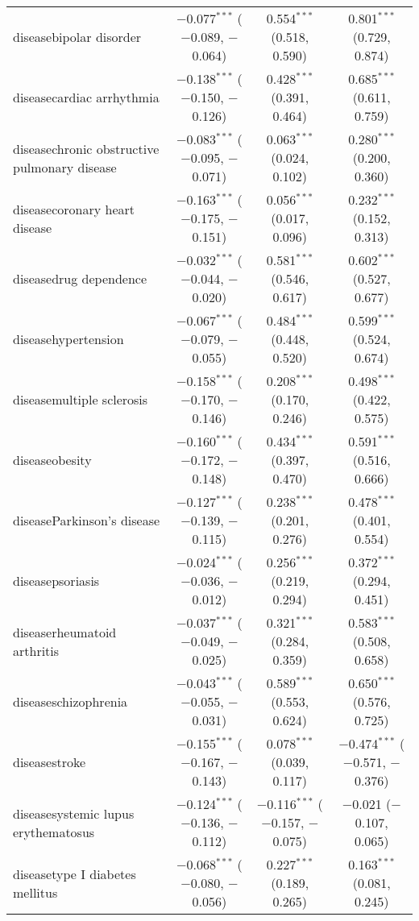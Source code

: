 \begin{table}[!htbp]
\begin{tabular}{@{\extracolsep{5pt}}lccc}
  diseasebipolar disorder & $-$0.077$^{***}$ ($-$0.089, $-$0.064) & 0.554$^{***}$ (0.518, 0.590) & 0.801$^{***}$ (0.729, 0.874) \\ 
  diseasecardiac arrhythmia & $-$0.138$^{***}$ ($-$0.150, $-$0.126) & 0.428$^{***}$ (0.391, 0.464) & 0.685$^{***}$ (0.611, 0.759) \\ 
  diseasechronic obstructive pulmonary disease & $-$0.083$^{***}$ ($-$0.095, $-$0.071) & 0.063$^{***}$ (0.024, 0.102) & 0.280$^{***}$ (0.200, 0.360) \\ 
  diseasecoronary heart disease & $-$0.163$^{***}$ ($-$0.175, $-$0.151) & 0.056$^{***}$ (0.017, 0.096) & 0.232$^{***}$ (0.152, 0.313) \\ 
  diseasedrug dependence & $-$0.032$^{***}$ ($-$0.044, $-$0.020) & 0.581$^{***}$ (0.546, 0.617) & 0.602$^{***}$ (0.527, 0.677) \\ 
  diseasehypertension & $-$0.067$^{***}$ ($-$0.079, $-$0.055) & 0.484$^{***}$ (0.448, 0.520) & 0.599$^{***}$ (0.524, 0.674) \\ 
  diseasemultiple sclerosis & $-$0.158$^{***}$ ($-$0.170, $-$0.146) & 0.208$^{***}$ (0.170, 0.246) & 0.498$^{***}$ (0.422, 0.575) \\ 
  diseaseobesity & $-$0.160$^{***}$ ($-$0.172, $-$0.148) & 0.434$^{***}$ (0.397, 0.470) & 0.591$^{***}$ (0.516, 0.666) \\ 
  diseaseParkinson's disease & $-$0.127$^{***}$ ($-$0.139, $-$0.115) & 0.238$^{***}$ (0.201, 0.276) & 0.478$^{***}$ (0.401, 0.554) \\ 
  diseasepsoriasis & $-$0.024$^{***}$ ($-$0.036, $-$0.012) & 0.256$^{***}$ (0.219, 0.294) & 0.372$^{***}$ (0.294, 0.451) \\ 
  diseaserheumatoid arthritis & $-$0.037$^{***}$ ($-$0.049, $-$0.025) & 0.321$^{***}$ (0.284, 0.359) & 0.583$^{***}$ (0.508, 0.658) \\ 
  diseaseschizophrenia & $-$0.043$^{***}$ ($-$0.055, $-$0.031) & 0.589$^{***}$ (0.553, 0.624) & 0.650$^{***}$ (0.576, 0.725) \\ 
  diseasestroke & $-$0.155$^{***}$ ($-$0.167, $-$0.143) & 0.078$^{***}$ (0.039, 0.117) & $-$0.474$^{***}$ ($-$0.571, $-$0.376) \\ 
  diseasesystemic lupus erythematosus & $-$0.124$^{***}$ ($-$0.136, $-$0.112) & $-$0.116$^{***}$ ($-$0.157, $-$0.075) & $-$0.021 ($-$0.107, 0.065) \\ 
  diseasetype I diabetes mellitus & $-$0.068$^{***}$ ($-$0.080, $-$0.056) & 0.227$^{***}$ (0.189, 0.265) & 0.163$^{***}$ (0.081, 0.245) \\ 

\end{tabular}
\end{table}
